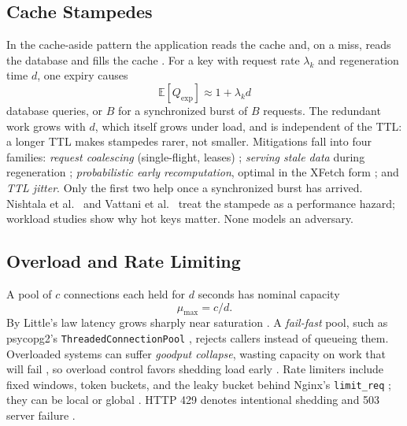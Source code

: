 \documentclass[journal]{IEEEtran}
\begin{document}
\subsection{Cache Stampedes}
In the cache-aside pattern the application reads the cache and, on a miss, reads the
database and fills the cache \cite{kleppmann2017}. For a key with request rate
$\lambda_k$ and regeneration time $d$, one expiry causes
\begin{equation}
\mathbb{E}[Q_{\mathrm{exp}}] \approx 1 + \lambda_k d
\label{eq:stampede}
\end{equation}
database queries, or $B$ for a synchronized burst of $B$ requests. The redundant work
grows with $d$, which itself grows under load, and is independent of the TTL: a longer
TTL makes stampedes rarer, not smaller. Mitigations fall into four families:
\emph{request coalescing} (single-flight, leases) \cite{nishtala2013,singleflight};
\emph{serving stale data} during regeneration \cite{rfc5861,nygard2018};
\emph{probabilistic early recomputation}, optimal in the XFetch form
\cite{vattani2015}; and \emph{TTL jitter}. Only the first two help once a synchronized
burst has arrived. Nishtala et al.\ \cite{nishtala2013} and Vattani et al.\
\cite{vattani2015} treat the stampede as a performance hazard; workload studies
\cite{atikoglu2012,huang2013,fan2011} show why hot keys matter. None models an
adversary.

\subsection{Overload and Rate Limiting}
A pool of $c$ connections each held for $d$ seconds has nominal capacity
\begin{equation}
\mu_{\max} = c/d .
\label{eq:capacity}
\end{equation}
By Little's law \cite{little1961} latency grows sharply near saturation
\cite{kleinrock1975}. A \emph{fail-fast} pool, such as psycopg2's
\texttt{ThreadedConnectionPool} \cite{psycopgpool}, rejects callers instead of queueing
them. Overloaded systems can suffer \emph{goodput collapse}, wasting capacity on work
that will fail \cite{jacobson1988,mogul1997}, so overload control favors shedding load
early \cite{welsh2001,welsh2003,cherkasova2002,beyer2016}. Rate limiters include fixed
windows, token buckets, and the leaky bucket behind Nginx's \texttt{limit\_req}
\cite{nginxlimitreq,tanenbaum2011}; they can be local or global \cite{raghavan2007}.
HTTP 429 denotes intentional shedding and 503 server failure \cite{rfc6585}.
\end{document}
